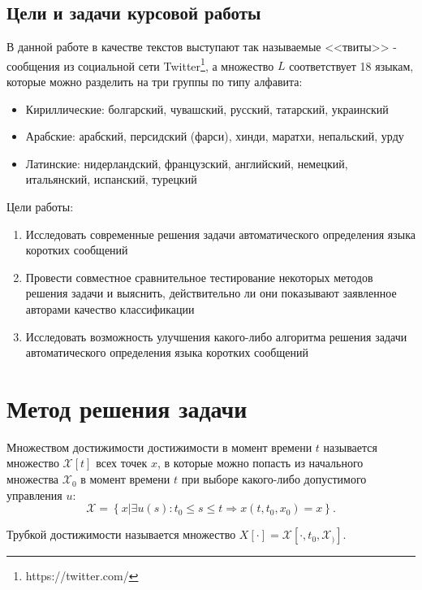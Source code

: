 \documentclass[a4paper, 14pt]{article}
\begin{document}
		\subsection{Цели и задачи курсовой работы}
		В данной работе в качестве текстов выступают так называемые <<твиты>> - сообщения из социальной сети Twitter\footnote{https://twitter.com/}, 
		а множество $L$ соответствует 18
		языкам, которые можно разделить на три группы по типу алфавита:
		\begin{itemize}
			\item Кириллические: болгарский, чувашский, русский, татарский, украинский
			\item Арабские: арабский, персидский (фарси), хинди, маратхи, непальский, урду
			\item Латинские: нидерландский, французский, английский, немецкий, итальянский, испанский, турецкий
		\end{itemize}
		Цели работы:
		\begin{enumerate}
			\item Исследовать современные решения задачи автоматического определения языка коротких сообщений
			\item Провести совместное сравнительное тестирование некоторых методов решения задачи и выяснить, действительно ли они показывают
			заявленное авторами качество классификации
			\item Исследовать возможность улучшения какого-либо алгоритма решения задачи автоматического определения языка коротких сообщений	
		\end{enumerate}

\section{Метод решения задачи}
		\begin{definition}
			Множеством достижимости достижимости в момент времени $t$ называется множество $\mathcal{X} [t]$ всех точек $x$, в которые можно попасть из начального множества $\mathcal{X}_0$ в момент времени $t$ при выборе какого-либо допустимого управления $u$:
			$$
				\mathcal{X} = \left\{ x | \exists u(s) : t_0 \leqslant s \leqslant t \Rightarrow x(t, t_0, x_0) = x \right\}.
			$$
		\end{definition}	
		
		\begin{definition}
			Трубкой достижимости называется множество $X[\cdot] = \mathcal{X} [\cdot, t_0, \mathcal{X}_)]$.
		\end{definition}
		
\end{document}
